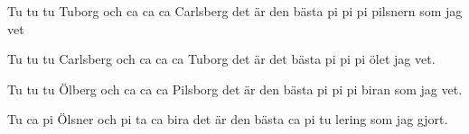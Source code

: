 	
\beginverse*						
Tu tu tu Tuborg 
och ca ca ca Carlsberg 
det är den bästa 
pi pi pi pilsnern som jag vet 
\endverse						

\beginverse				
Tu tu tu Carlsberg 
och ca ca ca Tuborg 
det är det bästa 
pi pi pi ölet jag vet. 
\endverse

\beginverse
Tu tu tu Ölberg 
och ca ca ca Pilsborg 
det är den bästa 
pi pi pi biran som jag vet. 
\endverse

\beginverse
Tu ca pi Ölsner och 
pi ta ca bira 
det är den bästa 
ca pi tu lering som jag gjort.
\endverse
\endsong		
